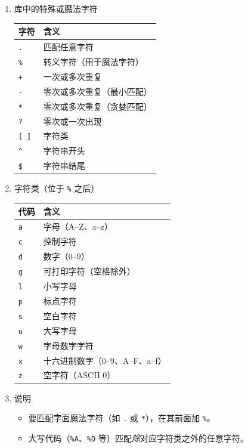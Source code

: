 \begin{enumerate}[label=(\alph*)]
\item {} 库中的特殊或魔法字符\\

\begin{center}
  \begin{tabular}{@{}ll@{}}
  \toprule
  \textbf{字符} & \textbf{含义} \\
  \midrule
  \texttt{.} & 匹配任意字符 \\
  \texttt{\%} & 转义字符（用于魔法字符） \\
  \texttt{+} & 一次或多次重复 \\
  \texttt{-} & 零次或多次重复（最小匹配） \\
  \texttt{*} & 零次或多次重复（贪婪匹配） \\
  \texttt{?} & 零次或一次出现 \\
  \texttt{[ ]} & 字符类 \\
  \texttt{\^{}} & 字符串开头 \\
  \texttt{\$} & 字符串结尾 \\
  \bottomrule
  \end{tabular}
\end{center}

\item 字符类（位于 \texttt{\%} 之后）

\begin{center}
  \begin{tabular}{@{}ll@{}}
  \toprule
  \textbf{代码} & \textbf{含义} \\
  \midrule
  \texttt{a} & 字母（A–Z、a–z） \\
  \texttt{c} & 控制字符 \\
  \texttt{d} & 数字（0–9） \\
  \texttt{g} & 可打印字符（空格除外） \\
  \texttt{l} & 小写字母 \\
  \texttt{p} & 标点字符 \\
  \texttt{s} & 空白字符 \\
  \texttt{u} & 大写字母 \\
  \texttt{w} & 字母数字字符 \\
  \texttt{x} & 十六进制数字（0–9、A–F、a–f） \\
  \texttt{z} & 空字符（ASCII 0） \\
  \bottomrule
  \end{tabular}
\end{center}

\item 说明
\begin{itemize}
    \item 要匹配字面魔法字符（如 \texttt{.} 或 \texttt{*}），在其前面加 \texttt{\%}。
    \item 大写代码（\texttt{\%A}、\texttt{\%D} 等）匹配\emph{除}对应字符类之外的任意字符。
\end{itemize}


\end{enumerate}
